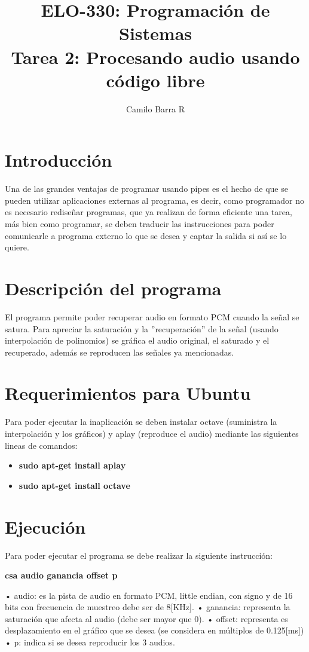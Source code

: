 \documentclass[]{article}
\begin{document}
\title{ELO-330: Programación de Sistemas\\
\textbf{Tarea 2: Procesando audio usando código libre}}
\author{Camilo Barra R}
\date{}
\maketitle

\section{Introducción}
Una de las grandes ventajas de programar usando pipes es el hecho de que se
pueden utilizar aplicaciones externas al programa, es decir, como programador
no es necesario rediseñar programas, que ya realizan de forma eficiente una tarea,
más bien como programar, se deben traducir las instrucciones para poder comunicarle a programa externo lo que se desea y captar la salida si así se lo quiere.

\section{Descripción del programa}
El programa permite poder recuperar audio en formato PCM cuando la señal
se satura. Para apreciar la saturación y la ”recuperación” de la señal (usando interpolación de polinomios) se gráfica el audio original, el saturado y el recuperado, además se reproducen las señales ya mencionadas.

\section{Requerimientos para Ubuntu}
Para poder ejecutar la inaplicación se deben instalar octave (suministra la interpolación y los gráficos) y aplay (reproduce el audio) mediante las siguientes lineas
de comandos:
\begin{itemize}
\item \textbf{sudo apt-get install aplay}
\item \textbf{sudo apt-get install octave}
\end{itemize}

\section{Ejecución}
Para poder ejecutar el programa se debe realizar la siguiente instrucción:
\begin{center}
\textbf{csa audio ganancia offset p}
\end{center}
• audio: es la pista de audio en formato PCM, little endian, con signo y de
16 bits con frecuencia de muestreo debe ser de 8[KHz].
• ganancia: representa la saturación  que afecta al audio (debe ser mayor
que 0).
• offset: representa es desplazamiento en el gráfico que se desea (se considera
en múltiplos de 0.125[ms])
• p: indica si se desea reproducir los 3 audios.
\end{document}

